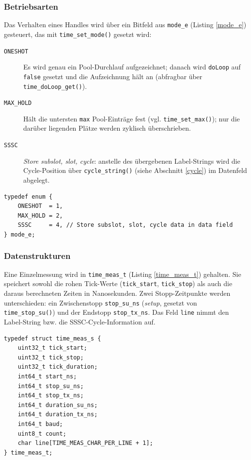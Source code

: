 \subsubsection*{Betriebsarten}
Das Verhalten eines Handles wird über ein Bitfeld aus \verb|mode_e|
(Listing \ref{mode_e}) gesteuert, das mit \verb|time_set_mode()|
gesetzt wird:
\begin{description}
\item[\texttt{ONESHOT}] Es wird genau ein Pool-Durchlauf aufgezeichnet;
  danach wird \verb|doLoop| auf \verb|false| gesetzt und die Aufzeichnung
  hält an (abfragbar über \verb|time_doLoop_get()|).
\item[\texttt{MAX\_HOLD}] Hält die untersten \verb|max| Pool-Einträge fest
  (vgl. \verb|time_set_max()|); nur die darüber liegenden Plätze werden
  zyklisch überschrieben.
\item[\texttt{SSSC}] \emph{Store subslot, slot, cycle}: anstelle des
  übergebenen Label-Strings wird die Cycle-Position über
  \verb|cycle_string()| (siehe Abschnitt \ref{cycle}) im Datenfeld
  abgelegt.
\end{description}

\begin{listing}
\begin{verbatim}
typedef enum {
    ONESHOT  = 1,
    MAX_HOLD = 2,
    SSSC     = 4, // Store subslot, slot, cycle data in data field
} mode_e;
\end{verbatim}
\caption{Betriebsarten \texttt{mode\_e}}
\label{mode_e}
\end{listing}

\subsubsection*{Datenstrukturen}
Eine Einzelmessung wird in \verb|time_meas_t| (Listing \ref{time_meas_t})
gehalten. Sie speichert sowohl die rohen Tick-Werte
(\verb|tick_start|, \verb|tick_stop|) als auch die daraus berechneten
Zeiten in Nanosekunden. Zwei Stopp-Zeitpunkte werden unterschieden: ein
Zwischenstopp \verb|stop_su_ns| (\emph{setup}, gesetzt von
\verb|time_stop_su()|) und der Endstopp \verb|stop_tx_ns|. Das Feld
\verb|line| nimmt den Label-String bzw. die SSSC-Cycle-Information auf.

\begin{listing}
\begin{verbatim}
typedef struct time_meas_s {
    uint32_t tick_start;
    uint32_t tick_stop;
    uint32_t tick_duration;
    int64_t start_ns;
    int64_t stop_su_ns;
    int64_t stop_tx_ns;
    int64_t duration_su_ns;
    int64_t duration_tx_ns;
    int64_t baud;
    uint8_t count;
    char line[TIME_MEAS_CHAR_PER_LINE + 1];
} time_meas_t;
\end{verbatim}
\caption{Definition der \texttt{time\_meas\_t} Struktur}
\label{time_meas_t}
\end{listing}

